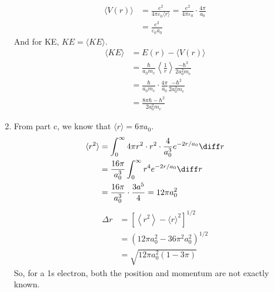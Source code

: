 \begin{solution}
\begin{enumerate}
\begin{align*}
                  \langle V(r)\rangle & =\frac{e^2}{4\pi\varepsilon_0\langle r\rangle}
                  =\frac{e^2}{4\pi\varepsilon_0}\cdot\frac{4\pi}{a_0}                  \\
                                      & =\frac{e^2}{\varepsilon_0a_0}
              \end{align*}
              And for KE, $KE=\langle KE\rangle$.
              \begin{align*}
                  \langle KE\rangle & =E(r)-\langle V(r)\rangle                                                                       \\
                                    & =\frac{\hbar}{a_{0}m_{e}}\left\langle\frac{1}{r}\right\rangle\frac{-\hbar^{2}}{2a_{0}^{2}m_{e}} \\
                                    & =\frac{\hbar}{a_{0}m_{e}}\cdot\frac{4\pi}{a_{0}}\frac{-\hbar^{2}}{2a_{0}^{2}m_e}                \\
                                    & =\frac{8\pi\hbar-\hbar^2}{2a_{0}^{2}m_e}
              \end{align*}
        \item From part c, we know that $\langle r\rangle=6\pi a_0$.
              \begin{align*}
                  \langle r^2\rangle & =\int_{0}^{\infty}4\pi r^{2}\cdot r^{2}\cdot\frac{4}{a_{0}^{3}}e^{-2r/a_{0}}\diff r \\
                                     & =\frac{16\pi}{a_{0}^{3}}\int_{0}^{\infty}r^{4}e^{-2r/a_{0}}\diff r                  \\
                                     & =\frac{16\pi}{a_{0}^{3}}\cdot\frac{3 a^{5}}{4}=12\pi a_{0}^{2}
              \end{align*}
              \begin{align*}
                  \Delta r & =\left[\left\langle r^{2}\right\rangle-\langle r\rangle^{2}\right]^{1/2} \\
                           & =(12\pi a_0^2-36\pi^2 a_0^2)^{1/2}                                       \\
                           & =\sqrt{12\pi a_0^2(1-3\pi)}
              \end{align*}
              So, for a 1s electron, both the position and momentum are not exactly known.
    \end{enumerate}
\end{solution}